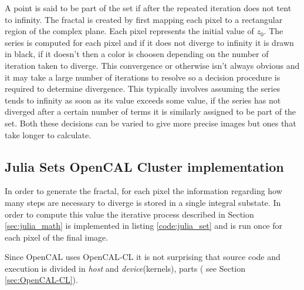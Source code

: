 A point is said to be part of the set if after the repeated iteration does not tent to infinity.
The fractal  is created by first mapping each pixel to a rectangular region of the complex plane. Each pixel represents the initial value of $z_0$. The series is computed for each pixel and if it does not diverge to infinity it is drawn in black, if it doesn't then a color is choosen depending on the number of iteration taken to diverge. This convergence or otherwise isn't always obvious and it may take a large number of iterations to resolve so a decision procedure is required to determine divergence. This typically involves assuming the series tends to infinity as soon as its value exceeds some value, if the series has not diverged after a certain number of terms it is similarly assigned to be part of the set. Both these decisions can be varied to give more precise images but ones that take longer to calculate. 

\subsection{Julia Sets OpenCAL Cluster implementation}
In order to generate the fractal, for each pixel the information regarding how many steps are necessary to diverge is stored in a single integral substate.
In order to compute this value the iterative process described in Section \ref{sec:julia_math} is implemented in listing \ref{code:julia_set} and is run once for each pixel of the final image.

Since OpenCAL uses OpenCAL-CL it is not surprising that source code and execution is divided in \textit{host} and \textit{device}(kernels), parts ( see Section \ref{sec:OpenCAL-CL}).  

